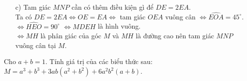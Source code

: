 \begin{ex}
{\begin{enumerate}
				$\Rightarrow \widehat{AEO}=\widehat{AHO}=90^\circ$.\\
				Do đó $\widehat{AEO}=90^\circ$ hay tam giác $DEA$ vuông tại $E$.
				\item [c)] Tam giác $MNP$ cần có thêm điều kiện gì để $DE=2EA$.\\
				Ta có $DE=2EA \Leftrightarrow{OE=EA}\Leftrightarrow$ tam giác $OEA$ vuông cân			$\Leftrightarrow\widehat{EOA}=45^\circ$.\\
				$\Leftrightarrow\widehat{HEO}=90^\circ$
				$\Leftrightarrow{MDEH}$ là hình vuông.\\
				$\Leftrightarrow{MH}$ là phân giác của góc $M$ và $MH$ là đường cao nên tam giác $MNP$ vuông cân tại $M$.
			\end{enumerate}
}
		\end{ex}
		\begin{ex}%
			Cho $a+b=1$. Tính giá trị của các biểu thức sau: $M=a^3+b^3+3ab(a^2+b^2)+6a^2b^2(a+b)$.
		\end{ex}
		

